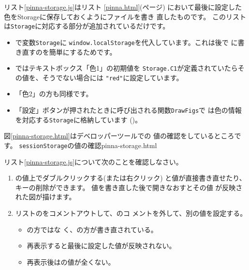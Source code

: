 リスト\ref{pinna-storage.js}はリスト
\ref{pinna.html}(\pageref{pinna.html}ページ)
において最後に設定した色をStorageに保存しておくように\JS ファイルを書き
直したものです。
このリストは\texttt{Storage}に対応する部分が追加されているだけです。
\begin{itemize}
 \item {}で変数\texttt{Storage}に
       \texttt{window.localStorage}を代入しています。これは後で
       に書き直すのを簡単にするためです。
 \item {}ではテキストボックス「色1」の初期値を
       \texttt{Storage.C1}が定義されていたらその値を、そうでない場合には
       \texttt{"red"}に設定しています。
 \item 「色2」の方も同様です。
 \item 「設定」ボタンが押されたときに呼び出される関数\texttt{DrawFigs}で
       は色の情報を対応する\texttt{Storage}に格納しています
       ()。
\end{itemize}
図\ref{pinna-storage.html}はデベロッパーツールでの
値の確認をしているところです。
{\protect\texttt{sessionStorage}の値の確認}{pinna-storage.html}
\begin{Problem}\upshape
 リスト\ref{pinna-storage.js}について次のことを確認しなさい。
 \begin{enumerate}
  \item {}の値上でダブルクリックする(または右クリック)
        と値が直接書き直せたり、キーの削除ができます。
        値を書き直した後で開きなおすとその値
        が反映された図が描けます。
  \item リストのをコメントアウトして、のコ
        メントを外して、別の値を設定する。
        \begin{itemize}
         \item {}の方ではな
        く、の方が書き直されている。
         \item 再表示すると最後に設定した値が反映されない。
         \item 再表示後はの値が全くない。
        \end{itemize}
\end{enumerate}
\end{Problem}

